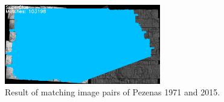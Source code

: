 \begin{figure}[htbp]
\begin{center}
{            \begin{minipage}[t]{0.48\linewidth}
                \centering
                \includegraphics[width=6.8cm]{images/Chapitre3/Pseudo-Homol-SuperGlue_1971-2015-GlobalR3D-PileImg_Ortho-MEC-Malt_Tapas_1971_Ortho-MEC-Malt_2015.png}
            \end{minipage}%
        }
        \caption{Result of matching image pairs of Pezenas 1971 and 2015.}
        \label{Match result}
    \end{center}
\end{figure} 




